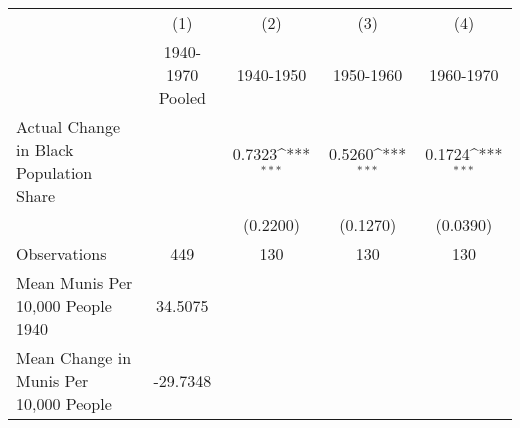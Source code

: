 {
\def\sym#1{\ifmmode^{#1}\else\(^{#1}\)\fi}
\begin{tabular}{l*{4}{c}}
\hline\hline
                    &\multicolumn{1}{c}{(1)}&\multicolumn{1}{c}{(2)}&\multicolumn{1}{c}{(3)}&\multicolumn{1}{c}{(4)}\\
                    &\multicolumn{1}{c}{1940-1970 Pooled}&\multicolumn{1}{c}{1940-1950}&\multicolumn{1}{c}{1950-1960}&\multicolumn{1}{c}{1960-1970}\\
\hline
Actual Change in Black Population Share&                     &      0.7323\sym{***}&      0.5260\sym{***}&      0.1724\sym{***}\\
                    &                     &    (0.2200)         &    (0.1270)         &    (0.0390)         \\
\hline
Observations        &         449         &         130         &         130         &         130         \\
Mean Munis Per 10,000 People 1940&     34.5075         &                     &                     &                     \\
Mean Change in Munis Per 10,000 People&    -29.7348         &                     &                     &                     \\
\hline\hline
\end{tabular}
}
